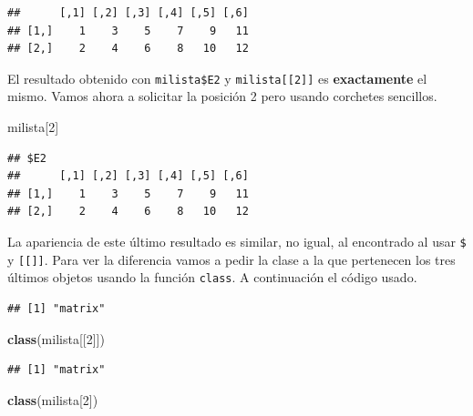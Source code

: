 \documentclass[10pt,]{krantz}
\makeatletter
\newenvironment{Shaded}{\begin{snugshade}}{\end{snugshade}}
\newcommand{\KeywordTok}[1]{\textcolor[rgb]{0.13,0.29,0.53}{\textbf{{#1}}}}
\newcommand{\DecValTok}[1]{\textcolor[rgb]{0.00,0.00,0.81}{{#1}}}
\newcommand{\NormalTok}[1]{{#1}}
\newenvironment{kframe}{%
\medskip{}
\setlength{\fboxsep}{.8em}
 \def\at@end@of@kframe{}%
 \ifinner\ifhmode%
  \def\at@end@of@kframe{\end{minipage}}%
  \begin{minipage}{\columnwidth}%
 \fi\fi%
 \def\FrameCommand##1{\hskip\@totalleftmargin \hskip-\fboxsep
 \colorbox{shadecolor}{##1}\hskip-\fboxsep
     \hskip-\linewidth \hskip-\@totalleftmargin \hskip\columnwidth}%
 \MakeFramed {\advance\hsize-\width
   \@totalleftmargin\z@ \linewidth\hsize
   \@setminipage}}%
 {\par\unskip\endMakeFramed%
 \at@end@of@kframe}
\renewenvironment{Shaded}{\begin{kframe}}{\end{kframe}}
\makeatother
\begin{document}
\begin{verbatim}
##      [,1] [,2] [,3] [,4] [,5] [,6]
## [1,]    1    3    5    7    9   11
## [2,]    2    4    6    8   10   12
\end{verbatim}

El resultado obtenido con \texttt{milista\$E2} y
\texttt{milista{[}{[}2{]}{]}} es \textbf{exactamente} el mismo. Vamos
ahora a solicitar la posición 2 pero usando corchetes sencillos.

\begin{Shaded}
\begin{Highlighting}[]
\NormalTok{milista[}\DecValTok{2}\NormalTok{]}
\end{Highlighting}
\end{Shaded}

\begin{verbatim}
## $E2
##      [,1] [,2] [,3] [,4] [,5] [,6]
## [1,]    1    3    5    7    9   11
## [2,]    2    4    6    8   10   12
\end{verbatim}

La apariencia de este último resultado es similar, no igual, al
encontrado al usar \texttt{\$} y \texttt{{[}{[}{]}{]}}. Para ver la
diferencia vamos a pedir la clase a la que pertenecen los tres últimos
objetos usando la función \texttt{class}. A continuación el código
usado.

\begin{Shaded}
\end{Shaded}

\begin{verbatim}
## [1] "matrix"
\end{verbatim}

\begin{Shaded}
\begin{Highlighting}[]
\KeywordTok{class}\NormalTok{(milista[[}\DecValTok{2}\NormalTok{]])}
\end{Highlighting}
\end{Shaded}

\begin{verbatim}
## [1] "matrix"
\end{verbatim}

\begin{Shaded}
\begin{Highlighting}[]
\KeywordTok{class}\NormalTok{(milista[}\DecValTok{2}\NormalTok{])}
\end{Highlighting}
\end{Shaded}
\end{document}
